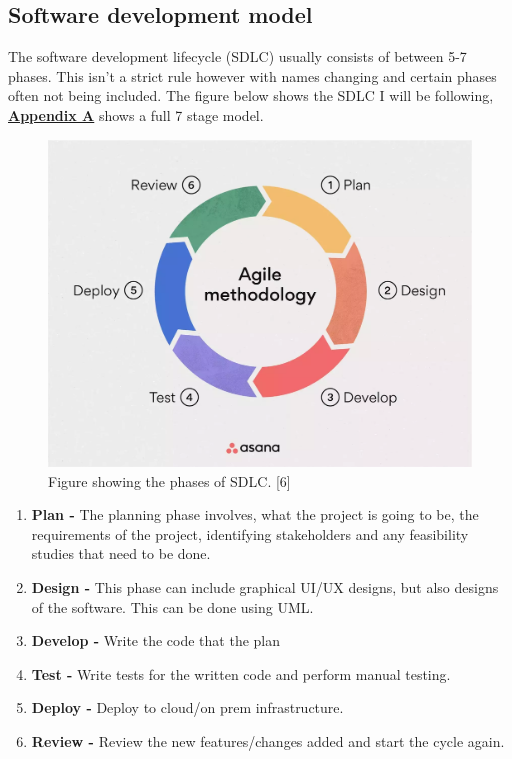   \subsection{Software development model}
  The software development lifecycle (SDLC) usually consists of between 5-7 phases. This isn't a strict rule however with names changing and 
  certain phases often not being included. The figure below shows the SDLC I will be following, \hyperref[sec:AppendixA]{\textbf{Appendix A}} 
  shows a full 7 stage model.

  \begin{figure}[H]
    \centering
    \includegraphics[width=12cm]{assets/sdlc.png}
    \caption{Figure showing the phases of SDLC. [6]}
    \label{fig:sdlc}
  \end{figure}

  \begin{enumerate}
    \item \textbf{Plan -} The planning phase involves, what the project is going to be, the requirements of the project, identifying stakeholders and 
    any feasibility studies that need to be done.
    \item \textbf{Design -} This phase can include graphical UI/UX designs, but also designs of the software. This can be done using UML.
    \item \textbf{Develop -} Write the code that the plan 
    \item \textbf{Test -} Write tests for the written code and perform manual testing.
    \item \textbf{Deploy -} Deploy to cloud/on prem infrastructure.
    \item \textbf{Review -} Review the new features/changes added and start the cycle again.
  \end{enumerate}

